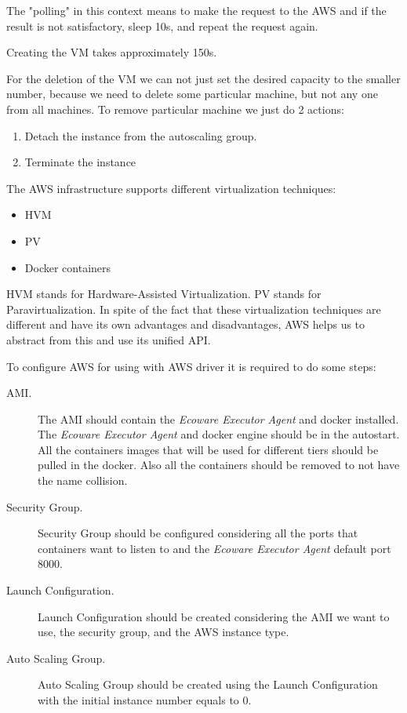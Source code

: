 The "polling" in this context means to make the request to the AWS and if the result is not satisfactory, sleep 10s, and repeat the request again.

Creating the VM takes approximately 150s.

For the deletion of the VM we can not just set the desired capacity to the smaller number, because we need to delete some particular machine, but not any one from all machines. To remove particular machine we just do 2 actions:
\begin{enumerate} 
    \item Detach the instance from the autoscaling group.
    \item Terminate the instance
\end{enumerate}

The AWS infrastructure supports different virtualization techniques:
\begin{itemize}
    \item HVM
    \item PV
    \item Docker containers
\end{itemize}
HVM stands for Hardware-Assisted Virtualization. 
PV stands for Paravirtualization.
In spite of the fact that these virtualization techniques are different and have its own advantages and disadvantages, AWS helps us to abstract from this and use its unified API.

To configure AWS for using with AWS driver it is required to do some steps:
\begin{description}
    \item [AMI.] The AMI should contain the \textit{Ecoware Executor Agent} and docker installed. The \textit{Ecoware Executor Agent} and docker engine should be in the autostart. All the containers images that will be used for different tiers should be pulled in the docker. Also all the containers should be removed to not have the name collision.
    \item [Security Group.] Security Group should be configured considering all the ports that containers want to listen to and the \textit{Ecoware Executor Agent} default port 8000.
    \item [Launch Configuration.] Launch Configuration should be created considering the AMI we want to use, the security group, and the AWS instance type.
    \item [Auto Scaling Group.] Auto Scaling Group should be created using the Launch Configuration with the initial instance number equals to 0.
\end{description}

